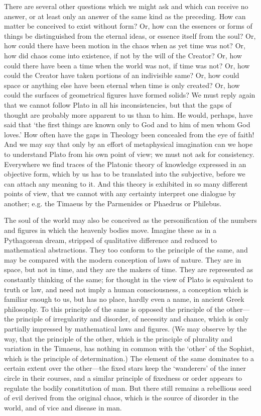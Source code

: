 \documentclass[11pt,letter]{article}
\begin{document}
\par  There are several other questions which we might ask and which can receive no answer, or at least only an answer of the same kind as the preceding. How can matter be conceived to exist without form? Or, how can the essences or forms of things be distinguished from the eternal ideas, or essence itself from the soul? Or, how could there have been motion in the chaos when as yet time was not? Or, how did chaos come into existence, if not by the will of the Creator? Or, how could there have been a time when the world was not, if time was not? Or, how could the Creator have taken portions of an indivisible same? Or, how could space or anything else have been eternal when time is only created? Or, how could the surfaces of geometrical figures have formed solids? We must reply again that we cannot follow Plato in all his inconsistencies, but that the gaps of thought are probably more apparent to us than to him. He would, perhaps, have said that ‘the first things are known only to God and to him of men whom God loves.’ How often have the gaps in Theology been concealed from the eye of faith! And we may say that only by an effort of metaphysical imagination can we hope to understand Plato from his own point of view; we must not ask for consistency. Everywhere we find traces of the Platonic theory of knowledge expressed in an objective form, which by us has to be translated into the subjective, before we can attach any meaning to it. And this theory is exhibited in so many different points of view, that we cannot with any certainty interpret one dialogue by another; e.g. the Timaeus by the Parmenides or Phaedrus or Philebus.

\par  The soul of the world may also be conceived as the personification of the numbers and figures in which the heavenly bodies move. Imagine these as in a Pythagorean dream, stripped of qualitative difference and reduced to mathematical abstractions. They too conform to the principle of the same, and may be compared with the modern conception of laws of nature. They are in space, but not in time, and they are the makers of time. They are represented as constantly thinking of the same; for thought in the view of Plato is equivalent to truth or law, and need not imply a human consciousness, a conception which is familiar enough to us, but has no place, hardly even a name, in ancient Greek philosophy. To this principle of the same is opposed the principle of the other—the principle of irregularity and disorder, of necessity and chance, which is only partially impressed by mathematical laws and figures. (We may observe by the way, that the principle of the other, which is the principle of plurality and variation in the Timaeus, has nothing in common with the ‘other’ of the Sophist, which is the principle of determination.) The element of the same dominates to a certain extent over the other—the fixed stars keep the ‘wanderers’ of the inner circle in their courses, and a similar principle of fixedness or order appears to regulate the bodily constitution of man. But there still remains a rebellious seed of evil derived from the original chaos, which is the source of disorder in the world, and of vice and disease in man.
\end{document}
